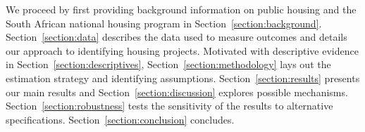 \documentclass[12pt]{article}
\begin{document}

We proceed by first providing background information on public housing and the South African national housing program in Section~\ref{section:background}.  Section~\ref{section:data} describes the data used to measure outcomes and details our approach to identifying housing projects. Motivated with descriptive evidence in Section~\ref{section:descriptives}, Section~\ref{section:methodology} lays out the estimation strategy and identifying assumptions. Section~\ref{section:results} presents our main results and Section~\ref{section:discussion} explores possible mechanisms.  Section~\ref{section:robustness} tests the sensitivity of the results to alternative specifications.  Section~\ref{section:conclusion} concludes.






\end{document}
